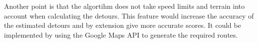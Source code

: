 Another point is that the algortihm does not take speed limits and terrain into account when calculating the detours.
This feature would increase the accuracy of the estimated detours and by extension give more accurate scores.
It could be implemented by using the Google Maps API to generate the required routes.

